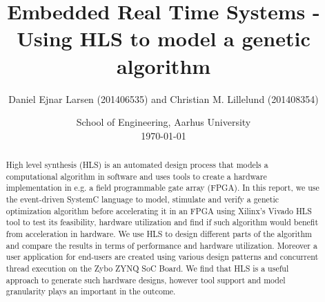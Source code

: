 \documentclass{article}
\title{Embedded Real Time Systems - Using HLS to model a genetic algorithm}
\author{Daniel Ejnar Larsen (201406535) and Christian M. Lillelund (201408354)}
\date{School of Engineering, Aarhus University\\ [\baselineskip] \today}
\begin{document}
\maketitle
\begin{abstract}
High level synthesis (HLS) is an automated design process that models a computational algorithm in software and uses tools to create a hardware implementation in e.g. a field programmable gate array (FPGA). In this report, we use the event-driven SystemC language to model, stimulate and verify a genetic optimization algorithm before accelerating it in an FPGA using Xilinx's Vivado HLS tool to test its feasibility, hardware utilization and find if such algorithm would benefit from acceleration in hardware. We use HLS to design different parts of the algorithm and compare the results in terms of performance and hardware utilization. Moreover a user application for end-users are created using various design patterns and concurrent thread execution on the Zybo ZYNQ SoC Board. We find that HLS is a useful approach to generate such hardware designs, however tool support and model granularity plays an important in the outcome.
\end{abstract}






















\appendix

%
\end{document}
